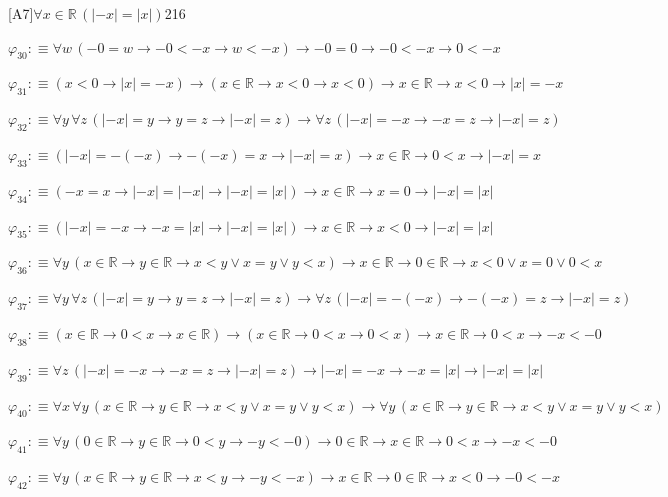 \begin{fullproof}{[A7]}{$\forall x \in \mathbb{R}\,(\lvert -x \rvert = \lvert x \rvert)$}{216}
\begin{abbrevlist}
\item $\varphi_{30} :\equiv \forall w\,(-0 = w \to -0 < -x \to w < -x) \to -0 = 0 \to -0 < -x \to 0 < -x$
\item $\varphi_{31} :\equiv (x < 0 \to \lvert x \rvert = -x) \to (x \in \mathbb{R} \to x < 0 \to x < 0) \to x \in \mathbb{R} \to x < 0 \to \lvert x \rvert = -x$
\item $\varphi_{32} :\equiv \forall y\,\forall z\,(\lvert -x \rvert = y \to y = z \to \lvert -x \rvert = z) \to \forall z\,(\lvert -x \rvert = -x \to -x = z \to \lvert -x \rvert = z)$
\item $\varphi_{33} :\equiv (\lvert -x \rvert = -(-x) \to -(-x) = x \to \lvert -x \rvert = x) \to x \in \mathbb{R} \to 0 < x \to \lvert -x \rvert = x$
\item $\varphi_{34} :\equiv (-x = x \to \lvert -x \rvert = \lvert -x \rvert \to \lvert -x \rvert = \lvert x \rvert) \to x \in \mathbb{R} \to x = 0 \to \lvert -x \rvert = \lvert x \rvert$
\item $\varphi_{35} :\equiv (\lvert -x \rvert = -x \to -x = \lvert x \rvert \to \lvert -x \rvert = \lvert x \rvert) \to x \in \mathbb{R} \to x < 0 \to \lvert -x \rvert = \lvert x \rvert$
\item $\varphi_{36} :\equiv \forall y\,(x \in \mathbb{R} \to y \in \mathbb{R} \to x < y \lor x = y \lor y < x) \to x \in \mathbb{R} \to 0 \in \mathbb{R} \to x < 0 \lor x = 0 \lor 0 < x$
\item $\varphi_{37} :\equiv \forall y\,\forall z\,(\lvert -x \rvert = y \to y = z \to \lvert -x \rvert = z) \to \forall z\,(\lvert -x \rvert = -(-x) \to -(-x) = z \to \lvert -x \rvert = z)$
\item $\varphi_{38} :\equiv (x \in \mathbb{R} \to 0 < x \to x \in \mathbb{R}) \to (x \in \mathbb{R} \to 0 < x \to 0 < x) \to x \in \mathbb{R} \to 0 < x \to -x < -0$
\item $\varphi_{39} :\equiv \forall z\,(\lvert -x \rvert = -x \to -x = z \to \lvert -x \rvert = z) \to \lvert -x \rvert = -x \to -x = \lvert x \rvert \to \lvert -x \rvert = \lvert x \rvert$
\item $\varphi_{40} :\equiv \forall x\,\forall y\,(x \in \mathbb{R} \to y \in \mathbb{R} \to x < y \lor x = y \lor y < x) \to \forall y\,(x \in \mathbb{R} \to y \in \mathbb{R} \to x < y \lor x = y \lor y < x)$
\item $\varphi_{41} :\equiv \forall y\,(0 \in \mathbb{R} \to y \in \mathbb{R} \to 0 < y \to -y < -0) \to 0 \in \mathbb{R} \to x \in \mathbb{R} \to 0 < x \to -x < -0$
\item $\varphi_{42} :\equiv \forall y\,(x \in \mathbb{R} \to y \in \mathbb{R} \to x < y \to -y < -x) \to x \in \mathbb{R} \to 0 \in \mathbb{R} \to x < 0 \to -0 < -x$

\end{abbrevlist}
\end{fullproof}
